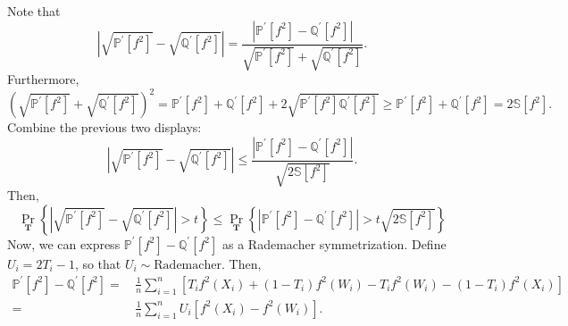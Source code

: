 Note that
\begin{equation*}
  \left| \sqrt{\mathbb{P}^{\prime} \left[ f^{2} \right]} -
  \sqrt{\mathbb{Q}^{\prime} \left[ f^{2} \right]} \right| = \frac{\left|
  \mathbb{P}^{\prime} \left[ f^{2} \right] - \mathbb{Q}^{\prime} \left[ f^{2}
  \right] \right|}{\sqrt{\mathbb{P}^{\prime} \left[ f^{2} \right]} +
  \sqrt{\mathbb{Q}^{\prime} \left[ f^{2} \right]}}.
\end{equation*}
Furthermore,
\begin{equation*}
  \left( \sqrt{\mathbb{P}^{\prime} \left[ f^{2} \right]} +
  \sqrt{\mathbb{Q}^{\prime} \left[ f^{2} \right]} \right)^{2} =
  \mathbb{P}^{\prime} \left[ f^{2} \right] + \mathbb{Q}^{\prime} \left[
  f^{2} \right] + 2 \sqrt{\mathbb{P}^{\prime} \left[ f^{2} \right]
  \mathbb{Q}^{\prime} \left[ f^{2} \right]} \geq \mathbb{P}^{\prime} \left[
  f^{2} \right] + \mathbb{Q}^{\prime} \left[ f^{2} \right] = 2
  \mathbb{S} \left[ f^{2} \right].
\end{equation*}
Combine the previous two displays:
\begin{equation*}
  \left| \sqrt{\mathbb{P}^{\prime} \left[ f^{2} \right]} -
  \sqrt{\mathbb{Q}^{\prime} \left[ f^{2} \right]} \right| \leq \frac{\left|
  \mathbb{P}^{\prime} \left[ f^{2} \right] - \mathbb{Q}^{\prime} \left[ f^{2}
  \right] \right|}{\sqrt{2 \mathbb{S} \left[ f^{2} \right]}}.
\end{equation*}
Then,
\begin{equation*}
  \Pr_{\mathbf{T}} \left\{ \left| \sqrt{\mathbb{P}^{\prime} \left[ f^{2}
  \right]} - \sqrt{\mathbb{Q}^{\prime} \left[ f^{2} \right]} \right| > t
  \right\} \leq \Pr_{\mathbf{T}} \left\{ \left| \mathbb{P}^{\prime} \left[ f^{2}
  \right] - \mathbb{Q}^{\prime} \left[ f^{2} \right] \right| > t \sqrt{2
  \mathbb{S} \left[ f^{2} \right]} \right\}
\end{equation*}
Now, we can express \(\mathbb{P}^{\prime} \left[ f^{2} \right] -
\mathbb{Q}^{\prime} \left[ f^{2} \right]\) as a Rademacher symmetrization.
Define \(U_{i} = 2 T_{i} - 1\), so that \(U_{i} \sim \mathrm{Rademacher}\).
Then,
\begin{align*}
  \mathbb{P}^{\prime} \left[ f^{2} \right] - \mathbb{Q}^{\prime} \left[ f^{2}
  \right] =
  & \, \frac{1}{n} \sum_{i = 1}^{n} \left[ T_{i} f^{2} \left( X_{i} \right)
  + \left( 1 - T_{i} \right) f^{2} \left( W_{i} \right) - T_{i} f^{2} \left(
  W_{i} \right) - \left( 1 - T_{i} \right) f^{2} \left( X_{i} \right) \right] \\
  =
  & \, \frac{1}{n} \sum_{i = 1}^{n} U_{i} \left[ f^{2} \left( X_{i} \right) -
  f^{2} \left( W_{i} \right) \right].
\end{align*}
